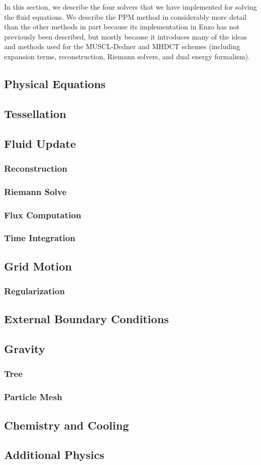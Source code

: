 In this section, we describe the four solvers that we have implemented
for solving the fluid equations.  We describe the PPM method in
considerably more detail than the other methods in part because its
implementation in Enzo has not previously been described, but mostly
because it introduces many of the ideas and methods used for the
MUSCL-Dedner and MHDCT schemes (including expansion terms,
reconstruction, Riemann solvers, and dual energy formalism).

\subsection{Physical Equations}

\subsection{Tessellation}

\subsection{Fluid Update}
\subsubsection{Reconstruction}
\subsubsection{Riemann Solve}
\subsubsection{Flux Computation}
\subsubsection{Time Integration}

\subsection{Grid Motion}
\subsubsection{Regularization}

\subsection{External Boundary Conditions}

\subsection{Gravity}
\subsubsection{Tree}
\subsubsection{Particle Mesh}

\subsection{Chemistry and Cooling}

\subsection{Additional Physics}

